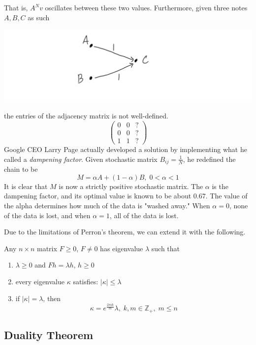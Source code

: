   That is, $A^N v$ oscillates between these two values. Furthermore, given three notes $A, B, C$ as such
  \begin{center}
      \includegraphics[scale=0.25]{img/Degeneratre_Markov_Chain.PNG} 
  \end{center}
  the entries of the adjacency matrix is not well-defined. 
  \[ \begin{pmatrix} 0&0&? \\0&0&? \\1&1&?\end{pmatrix}\]
  Google CEO Larry Page actually developed a solution by implementing what he called a \textit{dampening factor}. Given stochastic matrix $B_{i j} = \frac{1}{N}$, he redefined the chain to be 
  \[M = \alpha A + (1-\alpha) B, \; 0< \alpha < 1\]
  It is clear that $M$ is now a strictly positive stochastic matrix. The $\alpha$ is the dampening factor, and its optimal value is known to be about $0.67$. The value of the alpha determines how much of the data is "washed away." When $\alpha = 0$, none of the data is lost, and when $\alpha = 1$, all of the data is lost. 

  Due to the limitations of Perron's theorem, we can extend it with the following.

  \begin{theorem}
  Any $n \times n$ matrix $F \geq 0$, $F \neq 0$ has eigenvalue $\lambda$ such that
  \begin{enumerate}
      \item $\lambda \geq 0$ and $F h = \lambda h$, $h\geq 0$ \item every eigenvalue $\kappa$ satisfies: $|\kappa| \leq \lambda$ 
      \item if $|\kappa| = \lambda$, then 
  \[\kappa = e^{\frac{2 \pi i k}{m}} \lambda, \; k, m \in \mathbb{Z}_+, \; m \leq n\]
  \end{enumerate}
  \end{theorem}

\subsection{Duality Theorem}

